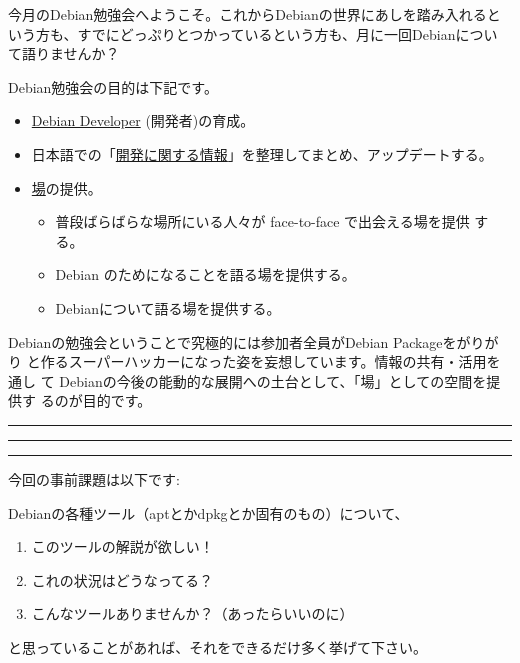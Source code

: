 \documentclass[mingoth,a4paper]{jsarticle}
\begin{document}
\begin{multicols}{2}
 

 今月のDebian勉強会へようこそ。これからDebianの世界にあしを踏み入れると
 いう方も、すでにどっぷりとつかっているという方も、月に一回Debianについ
 て語りませんか？

 Debian勉強会の目的は下記です。

 \begin{itemize}
 \item \underline{Debian Developer} (開発者)の育成。
 \item 日本語での「\underline{開発に関する情報}」を整理してまとめ、アップデートする。
 \item \underline{場}の提供。
 \begin{itemize}
  \item 普段ばらばらな場所にいる人々が face-to-face で出会える場を提供
	する。
  \item Debian のためになることを語る場を提供する。
  \item Debianについて語る場を提供する。
 \end{itemize}
 \end{itemize}		

 Debianの勉強会ということで究極的には参加者全員がDebian Packageをがりがり
 と作るスーパーハッカーになった姿を妄想しています。情報の共有・活用を通し
 て Debianの今後の能動的な展開への土台として、「場」としての空間を提供す
 るのが目的です。

\end{multicols}

\newpage

\begin{minipage}[b]{0.2\hsize}
 \colorbox{titleback}{}
\end{minipage}
\begin{minipage}[b]{0.8\hsize}
\hrule
\vspace{2mm}
\hrule
\begin{multicols}{2}
\tableofcontents
\end{multicols}
\vspace{2mm}
\hrule
\end{minipage}


今回の事前課題は以下です:

Debianの各種ツール（aptとかdpkgとか固有のもの）について、
\begin{enumerate}
\item このツールの解説が欲しい！
\item これの状況はどうなってる？
\item こんなツールありませんか？（あったらいいのに）
\end{enumerate}
と思っていることがあれば、それをできるだけ多く挙げて下さい。
\end{document}
